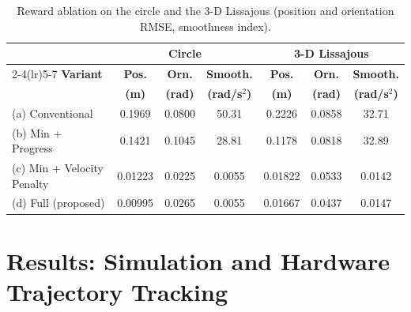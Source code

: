 \begin{table}[htbp]
\centering
\caption{Reward ablation on the circle and the 3-D Lissajous (position and orientation RMSE,
smoothness index).}
\label{tab:dikppo_ablationtab}
\footnotesize
\setlength{\tabcolsep}{4pt}
\begin{tabular}{lcccccc}
\toprule
 & \multicolumn{3}{c}{\textbf{Circle}} & \multicolumn{3}{c}{\textbf{3-D Lissajous}} \\
\cmidrule(lr){2-4}\cmidrule(lr){5-7}
\textbf{Variant} & \textbf{Pos.} & \textbf{Orn.} & \textbf{Smooth.} & \textbf{Pos.} & \textbf{Orn.} & \textbf{Smooth.} \\
 & \textbf{(m)} & \textbf{(rad)} & \textbf{(rad/s$^{2}$)} & \textbf{(m)} & \textbf{(rad)} & \textbf{(rad/s$^{2}$)} \\
\midrule
(a) Conventional             & 0.1969  & 0.0800 & 50.31  & 0.2226  & 0.0858 & 32.71 \\
(b) Min + Progress           & 0.1421  & 0.1045 & 28.81  & 0.1178  & 0.0818 & 32.89 \\
(c) Min + Velocity Penalty   & 0.01223 & 0.0225 & 0.0055 & 0.01822 & 0.0533 & 0.0142 \\
(d) Full (proposed)          & 0.00995 & 0.0265 & 0.0055 & 0.01667 & 0.0437 & 0.0147 \\
\bottomrule
\end{tabular}
\end{table}

\section{Results: Simulation and Hardware Trajectory Tracking}\label{sec:dikppo_results}

